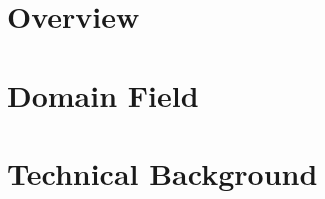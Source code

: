 
\newcommand*{\back}{chapters/background/}

\section{Overview}
	
\section{Domain Field}
	
\section{Technical Background}
	